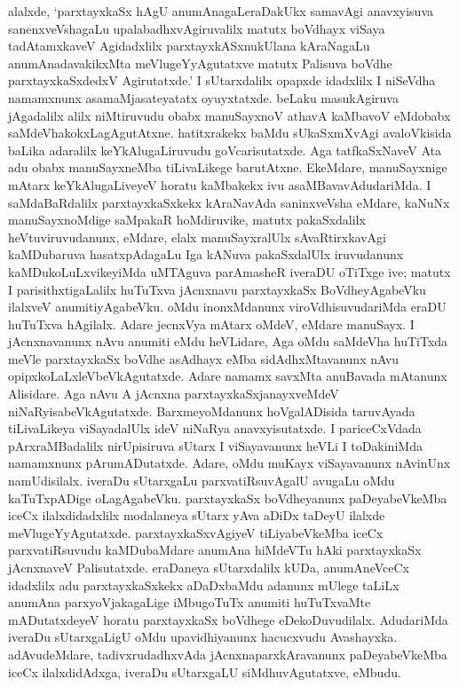 alalxde, `parxtayxkaSx hAgU anumAnagaLeraDakUkx samavAgi anavxyisuva sanenxveVshagaLu upalabadhxvAgiruvalilx matutx boVdhayx viSaya tadAtamxkaveV Agidadxlilx parxtayxkASxnu\-kUlana kAraNagaLu anumAnadavakikxMta meVlugeYyAgutatxve matutx Palisuva boVdhe \hbox{parxtayxkaSxdedxV} Agirutatxde.' I sUtarxdalilx opapxde idadxlilx I niSeVdha namamxnunx asamaMjasateyatatx oyuyxtatxde. beLaku masukAgiruva jAgadalilx alilx niMtiruvudu obabx manuSayxnoV athavA kaMbavoV eMdobabx saMdeVhakokxLagAgutAtxne. hatitxrakekx baMdu sUkaSxmXvAgi ava\-loVki\-sida baLika adaralilx keYkAlugaLiruvudu goVcarisutatxde. Aga tatfkaSxNaveV Ata adu obabx manuSayxneMba tiLivaLikege barutAtxne. EkeMdare, manuSayxnige mAtarx keYkAlu\-gaLi\-veyeV horatu kaMbakekx ivu asaMBavavAdudariMda. I saMdaBaRdalilx parxtayxkaSxkekx kAraNa\-vAda saninxveVsha eMdare, kaNuNx manuSayxnoMdige saMpakaR hoMdiruvike, matutx pakaSxdalilx heVtuviruvudanunx, eMdare, elalx manuSayxralUlx sAvaRtirxkavAgi kaMDubaruva hasatxpAdagaLu Iga kANuva pakaSxdalUlx iruvudanunx kaMDukoLuLxvikeyiMda uMTAguva parAmasheR iveraDU oTiTxge ive; matutx I parisithxtigaLalilx huTuTxva jAcnxnavu parxtayxkaSx BoVdheyAgabeVku ilalxveV anumitiyAgabeVku. oMdu inonxMdanunx viroVdhisu\-vudariMda eraDU huTuTxva hAgilalx. Adare jecnxVya mAtarx oMdeV, eMdare manuSayx. I jAcnxnavanunx nAvu anumiti eMdu heVLidare, Aga oMdu saMdeVha huTiTxda meVle parxtayxkaSx boVdhe asAdhayx eMba sidAdhxMtavanunx nAvu opipxkoLaLxleVbeVkAgutatxde. Adare namamx savxMta anuBavada mAtanunx Alisidare. Aga nAvu A jAcnxna parxtayxkaSxjanayxveMdeV niNaRyisabeVkAgutatxde. BarxmeyoMdanunx hoVgalADisida taruvAyada tiLivaLikeya viSayadalUlx ideV niNaRya anavxyisutatxde. I pariceCxVdada pArxraMBadalilx nirUpi\-siruva sUtarx I viSayavanunx heVLi I toDakiniMda namamxnunx pArumADutatxde. Adare, oMdu muKayx viSayavanunx nAvinUnx namUdisilalx. iveraDu sUtarxgaLu parxvatiRsu\-vAgalU avugaLu oMdu kaTuTxpADige oLagAgabeVku. parxtayxkaSx boVdheyanunx paDeya\-beVkeMba iceCx ilalxdidadxlilx modalaneya sUtarx yAva aDiDx taDeyU ilalxde meVlugeY\-yAgutatxde. parxtayxkaSxvAgiyeV tiLiyabeVkeMba iceCx parxvatiRsuvudu kaMDu\-baMdare anu\-mAna hiMdeVTu hAki parxtayxkaSx jAcnxnaveV Palisutatxde. eraDaneya sUtarxdalilx kUDa, anu\-mAneVceCx idadxlilx adu parxtayxkaSxkekx aDaDxbaMdu adanunx mUlege taLiLx anumAna parxyoVjaka\-gaLige iMbugoTuTx anumiti huTuTxvaMte mADutatxdeyeV horatu parxtayxkaSx \hbox{boVdhege} eDekoDuvudilalx. AdudariMda iveraDu sUtarxgaLigU oMdu upavidhiyanunx hacucx\-vudu Avashayxka. adAvudeMdare, tadivxrudadhxvAda jAcnxnaparxkAravanunx paDeya\-beVkeMba iceCx ilalxdidAdxga, iveraDu sUtarxgaLU siMdhuvAgutatxve, eMbudu.


